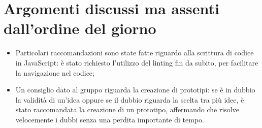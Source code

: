\documentclass[VER-2017-12-08.tex]{subfiles}
\begin{document}
\section{Argomenti discussi ma assenti dall'ordine del giorno}
\begin{itemize}
	\item Particolari raccomandazioni sono state fatte riguardo alla scrittura di codice in JavaScript: è stato richiesto l'utilizzo del linting fin da subito, per facilitare la navigazione nel codice;
	\item Un consiglio dato al gruppo riguarda la creazione di prototipi: se è in dubbio la validità di un'idea oppure se il dubbio riguarda la scelta tra più idee, è stato raccomandata la creazione di un prototipo, affermando che risolve velocemente i dubbi senza una perdita importante di tempo.
\end{itemize}
\end{document}
